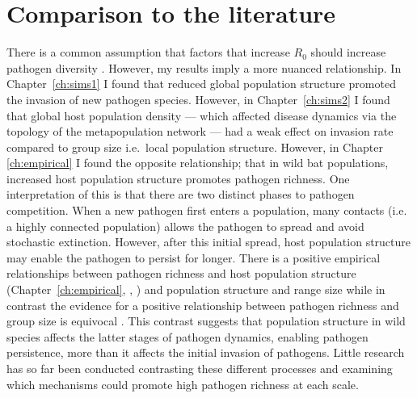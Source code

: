\section{Comparison to the literature}

There is a common assumption that factors that increase $R_0$ should increase pathogen diversity \cite{nunn2003comparative, morand2000wormy}.
However, my results imply a more nuanced relationship. 
In Chapter~\ref{ch:sims1} I found that reduced global population structure promoted the invasion of new pathogen species.
However, in Chapter~\ref{ch:sims2} I found that global host population density ---  which affected disease dynamics via the topology of the metapopulation network --- had a weak effect on invasion rate compared to group size i.e.\ local population structure.
However, in Chapter \ref{ch:empirical} I found the opposite relationship; that in wild bat populations, increased host population structure promotes pathogen richness.
One interpretation of this is that there are two distinct phases to pathogen competition.
When a new pathogen first enters a population, many contacts (i.e. a highly connected population) allows the pathogen to spread and avoid stochastic extinction.
However, after this initial spread, host population structure may enable the pathogen to persist for longer.
There is a positive empirical relationships between pathogen richness and host population structure (Chapter~\ref{ch:empirical}, \textcite{turmelle2009correlates}, \textcite{maganga2014bat}) and population structure and range size \cite{kamiya2014determines, nunn2003comparative} while in contrast the evidence for a positive relationship between pathogen richness and  group size is equivocal \cite{rifkin2012animals, ezenwa2006host}.
This contrast suggests that population structure in wild species affects the latter stages of pathogen dynamics, enabling pathogen persistence, more than it affects the initial invasion of pathogens.
Little research has so far been conducted contrasting these different processes and examining which mechanisms could promote high pathogen richness at each scale.

